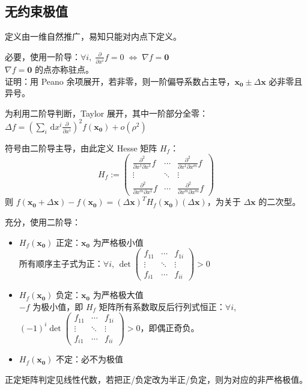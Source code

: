 \documentclass[12pt, a4paper, UTF8, openany]{ctexbook}
\newcommand{\difx}{\,\mathrm{d}x}
\newcommand{\mat}[1]{\mathbf{#1}}
\begin{document}
        \subsection{无约束极值}
        定义由一维自然推广，易知只能对内点下定义。

        必要，使用一阶导：$\forall i, \; \frac{\partial}{\partial x^i} f = 0 \; \iff \; \nabla f = \mat{0}$ \\
        $\nabla f = \mat{0}$ 的点亦称驻点。\\
        证明：用 Peano 余项展开，若非零，则一阶偏导系数占主导，$\mat{x_0} \pm \Delta\mat{x}$ 必非零且异号。

        为利用二阶导判断，Taylor 展开，其中一阶部分全零：$\Delta f = (\sum_{i} \difx^i \frac{\partial}{\partial x^i})^2 f(\mat{x_0}) + o(\rho^2)$

        符号由二阶导主导，由此定义 Hesse 矩阵 $H_f$：
        $$H_f := \begin{pmatrix}
            \frac{\partial^2}{\partial x^1 \partial x^1} f & \cdots & \frac{\partial^2}{\partial x^1 \partial x^m} f \\
            \vdots & \ddots & \vdots \\
            \frac{\partial^2}{\partial x^m \partial x^1} f & \cdots & \frac{\partial^2}{\partial x^m \partial x^m} f
        \end{pmatrix}$$
        则 $f(\mat{x_0} + \Delta\mat{x}) - f(\mat{x_0}) = (\Delta\mat{x})^T H_f(\mat{x_0}) (\Delta\mat{x})$，为关于 $\Delta\mat{x}$ 的二次型。

        充分，使用二阶导：
        \begin{itemize}
            \item $H_f(\mat{x_0})$ 正定：$\mat{x_0}$ 为严格极小值 \\
                所有顺序主子式为正：$\forall i$, $\det \begin{pmatrix}
                    f_{11} & \cdots & f_{1i} \\
                    \vdots & \ddots & \vdots \\
                    f_{i1} & \cdots & f_{ii}
                \end{pmatrix} > 0$
            \item $H_f(\mat{x_0})$ 负定：$\mat{x_0}$ 为严格极大值 \\
                $-f$ 为极小值，即 $H_f$ 矩阵所有系数取反后行列式恒正：$\forall i$, $(-1)^i \det \begin{pmatrix}
                    f_{11} & \cdots & f_{1i} \\
                    \vdots & \ddots & \vdots \\
                    f_{i1} & \cdots & f_{ii}
                \end{pmatrix} > 0$，即偶正奇负。
            \item $H_f(\mat{x_0})$ 不定：必不为极值
        \end{itemize}
        正定矩阵判定见线性代数，若把正/负定改为半正/负定，则为对应的非严格极值。
\end{document}
